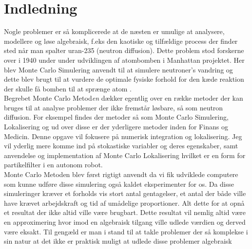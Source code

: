 \documentclass[../../SRP.tex]{subfiles}
\begin{document}
\chapter{Indledning}

Nogle problemer er så komplicerede at de næsten er umulige at analysere, modellere og løse algebraisk, f.eks den kaotiske og tilfældige process der finder sted når man spalter uran-235 (neutron diffusion). Dette problem stod forskerne over i 1940 under under udviklingen af atombomben i Manhattan projektet. Her blev Monte Carlo Simulering anvendt til at simulere neutroner's vandring og dette blev brugt til at vurdere de optimale fysiske forhold for den kæde reaktion der skulle få bomben til at sprænge atom \cite{AHF}. \\

Begrebet Monte Carlo Metod\textit{en} dækker egentlig over en række metoder der kan bruges til at analyse problemer der ikke fremstår løsbare, så som neutron diffusion. For eksempel findes der metoder så som Monte Carlo Simulering, Lokalisering og ud over disse er der yderligere metoder inden for Finans og Medicin. Denne opgave vil fokusere på numerisk integration og lokalisering. Jeg vil yderlig mere komme ind på stokastiske variabler og deres egenskaber, samt anvendelse og implementation af Monte Carlo Lokalisering hvilket er en form for partikelfilter i en autonom robot. \\

Monte Carlo Metoden blev først rigtigt anvendt da vi fik udviklede computere som kunne udføre disse simulering også kaldet eksperimenter for os. Da disse simuleringer kræver et forholds vis stort antal gentagelser, et antal der både ville have krævet arbejdskraft og tid af umådelige proportioner. Alt dette for at opnå et resultat der ikke altid ville være brugbart. Dette resultat vil nemlig altid være en approximering hvor imod en algebraisk tilgang ville udlede værdien og derved være eksakt. Til gengæld er man i stand til at takle problemer der så komplekse i sin natur at det ikke er praktisk muligt at udlede disse problemer algebraisk \cite{SBM} \\
\end{document}
